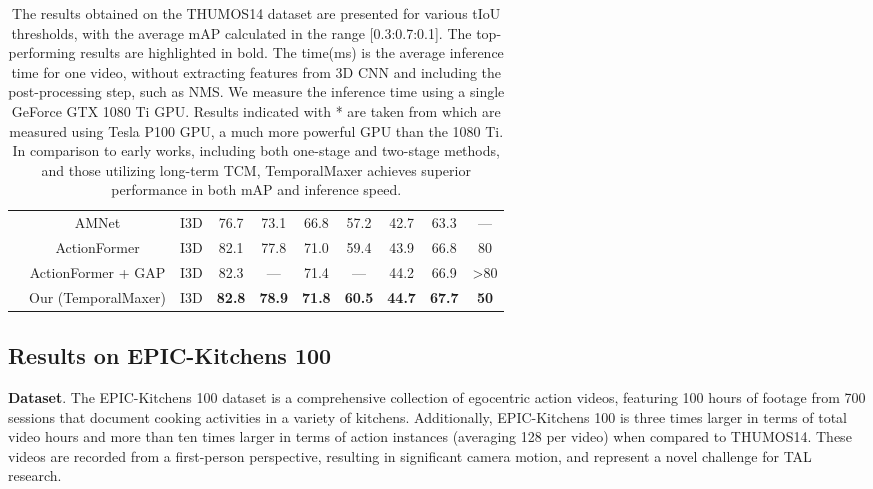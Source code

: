 \documentclass[10pt,twocolumn,letterpaper]{article}
\begin{document}
\begin{table*}[]
{\begin{tabular}{cccccccccc}
                              & AMNet \cite{liu2022end}                                                 & I3D \cite{carreira2017quo}      & 76.7          & 73.1          & 66.8          & 57.2          & 42.7          &  63.3 & ---\\
& ActionFormer \cite{zhang2022actionformer}                               & I3D \cite{carreira2017quo}      & 82.1          & 77.8          & 71.0          & 59.4          & 43.9          & 66.8 & 80 \\
                              & ActionFormer \cite{zhang2022actionformer} + GAP \cite{nag2022post} & I3D \cite{carreira2017quo}      & 82.3          & ---          & 71.4          & ---       &  44.2          & 66.9  & \textgreater 80 \\
                              \cline{2-10}
                              & Our (TemporalMaxer) & I3D \cite{carreira2017quo}      & \textbf{82.8} & \textbf{78.9} & \textbf{71.8} & \textbf{60.5} & \textbf{44.7} & \textbf{67.7} &  \textbf{50} \\ \cline{2-10}   
\end{tabular}
}
\caption{The results obtained on the THUMOS14 dataset \cite{idrees2017thumos} are presented for various tIoU thresholds, with the average mAP calculated in the range [0.3:0.7:0.1]. The top-performing results are highlighted in bold. The time(ms) is the average inference time for one video, without extracting features from 3D CNN and including the post-processing step, such as NMS. We measure the inference time using a single GeForce GTX 1080 Ti GPU. Results indicated with * are taken from \cite{liu2022end} which are measured using Tesla P100 GPU, a much more powerful GPU than the 1080 Ti. In comparison to early works, including both one-stage and two-stage methods, and those utilizing long-term TCM, TemporalMaxer achieves superior performance in both mAP and inference speed.}
\label{table:sota_thumos}
\end{table*}
 
\subsection{Results on EPIC-Kitchens 100}
\textbf{Dataset}. The EPIC-Kitchens 100 dataset \cite{damen2020rescaling} is a comprehensive collection of egocentric action videos, featuring 100 hours of footage from 700 sessions that document cooking activities in a variety of kitchens. Additionally, EPIC-Kitchens 100 is three times larger in terms of total video hours and more than ten times larger in terms of action instances (averaging 128 per video) when compared to THUMOS14. These videos are recorded from a first-person perspective, resulting in significant camera motion, and represent a novel challenge for TAL research.
\end{document}
